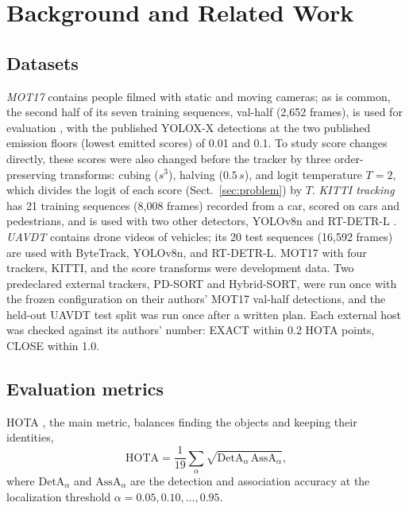\section{Background and Related Work}\label{sec:related}

\subsection{Datasets}\label{sec:data}
\emph{MOT17} \cite{milan2016mot16} contains people filmed with static and moving cameras; as is
common, the second half of its seven training sequences, val-half (2,652 frames), is used for
evaluation \cite{zhang2022bytetrack}, with the published YOLOX-X detections \cite{ge2021yolox} at the
two published emission floors (lowest emitted scores) of 0.01 and 0.1. To study score changes
directly, these scores were also changed before the tracker by three order-preserving transforms:
cubing ($s^3$), halving ($0.5\,s$), and logit temperature $T=2$, which divides the logit
of each score (Sect.~\ref{sec:problem}) by $T$. \emph{KITTI tracking} \cite{geiger2012kitti} has 21
training sequences (8,008 frames) recorded from a car, scored on cars and pedestrians, and is used
with two other detectors, YOLOv8n \cite{jocher2023yolov8} and RT-DETR-L \cite{zhao2024rtdetr}.
\emph{UAVDT} \cite{du2018uavdt} contains drone videos of vehicles; its 20 test sequences (16,592
frames) are used with ByteTrack, YOLOv8n, and RT-DETR-L. MOT17 with four trackers, KITTI, and the
score transforms were development data. Two predeclared external trackers, PD-SORT and Hybrid-SORT,
were run once with the frozen configuration on their authors' MOT17 val-half detections, and the
held-out UAVDT test split was run once after a written plan. Each external host was checked against
its authors' number: EXACT within 0.2 HOTA points, CLOSE within 1.0.

\subsection{Evaluation metrics}\label{sec:metrics}
HOTA \cite{luiten2021hota}, the main metric, balances finding the objects and keeping their
identities,
\begin{equation}
\mathrm{HOTA}=\frac{1}{19}\sum_{\alpha}\sqrt{\mathrm{DetA}_\alpha\,\mathrm{AssA}_\alpha},
\label{eq:hota}
\end{equation}
where $\mathrm{DetA}_\alpha$ and $\mathrm{AssA}_\alpha$ are the detection and association accuracy
at the localization threshold $\alpha=0.05,0.10,\dots,0.95$.

